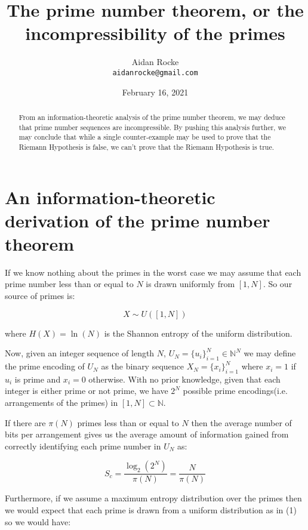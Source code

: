 \documentclass{article}
\title{The prime number theorem, or the incompressibility of the primes}
\date{February 16, 2021}
\author{%
  Aidan Rocke\\
  \texttt{aidanrocke@gmail.com} \\
}
\begin{document}
\maketitle

\begin{abstract}
   From an information-theoretic analysis of the prime number theorem, we may deduce that prime number sequences are incompressible. By pushing this analysis further, we may conclude that while a single counter-example may be used to prove that the Riemann Hypothesis is false, we can't prove that the Riemann Hypothesis is true. 
   \end{abstract}

\section{An information-theoretic derivation of the prime number theorem}

If we know nothing about the primes in the worst case we may assume that each prime number less than or equal to $N$ is drawn uniformly from $[1,N]$. So our source of primes is: 

\begin{equation}
X \sim U([1,N])	
\end{equation}

where $H(X) = \ln(N)$ is the Shannon entropy of the uniform distribution.  

Now, given an integer sequence of length $N$, $U_N = \{u_i\}_{i=1}^N \in \mathbb{N}^N$ we may define the prime encoding of $U_N$ as the binary sequence $X_N = \{x_i\}_{i=1}^N$ where $x_i =1$ if $u_i$ is prime and 
$x_i=0$ otherwise. With no prior knowledge, given that each integer is either prime or not prime, 
we have $2^N$ possible prime encodings(i.e. arrangements of the primes) in $[1,N] \subset \mathbb{N}$. 

If there are $\pi(N)$ primes less than or equal to $N$ then the average number of bits per arrangement gives us the average amount of information gained from correctly identifying each prime number in $U_N$ as: 

\begin{equation}
S_c = \frac{\log_2 (2^N)}{\pi(N)}= \frac{N}{\pi(N)}	
\end{equation}

Furthermore, if we assume a maximum entropy distribution over the primes then we would expect that each prime is drawn from a uniform distribution as in (1) so we would have: 
\end{document}
